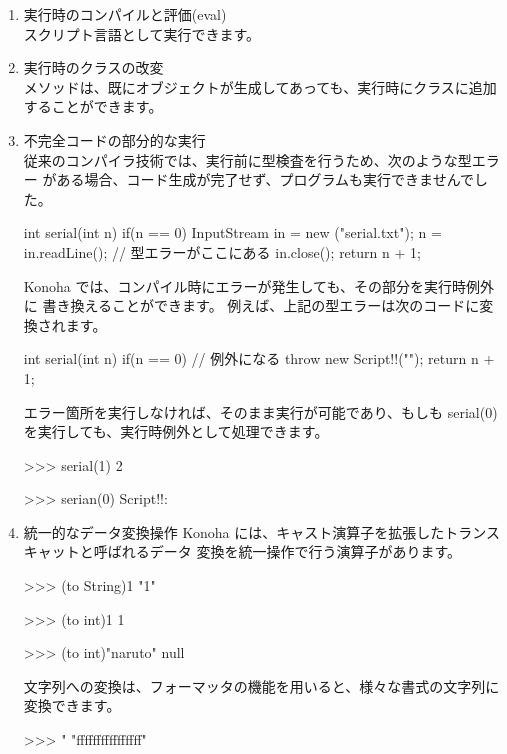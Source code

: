 \documentclass[mingoth,a4paper]{jsarticle}
\begin{document}
\begin{enumerate}
\item 実行時のコンパイルと評価(eval)\\
スクリプト言語として実行できます。

\item 実行時のクラスの改変\\
メソッドは、既にオブジェクトが生成してあっても、実行時にクラスに追加
することができます。

\item 不完全コードの部分的な実行\\
従来のコンパイラ技術では、実行前に型検査を行うため、次のような型エラー
がある場合、コード生成が完了せず、プログラムも実行できませんでした。

\begin{commandline}
int serial(int n) {
  if(n == 0) {
    InputStream in = new ("serial.txt");
    n = in.readLine(); // 型エラーがここにある
    in.close();
  }
  return n + 1;
}
\end{commandline}

Konoha では、コンパイル時にエラーが発生しても、その部分を実行時例外に
書き換えることができます。
例えば、上記の型エラーは次のコードに変換されます。

\begin{commandline}
int serial(int n) {
  if(n == 0) { // 例外になる
    throw new Script!!("");
  }
  return n + 1;
}
\end{commandline}

エラー箇所を実行しなければ、そのまま実行が可能であり、もしも
serial(0) を実行しても、実行時例外として処理できます。

\begin{commandline}
>>> serial(1)
2

>>> serian(0)
Script!!:
\end{commandline}

\item 統一的なデータ変換操作
Konoha には、キャスト演算子を拡張したトランスキャットと呼ばれるデータ
変換を統一操作で行う演算子があります。

\begin{commandline}
>>> (to String)1
"1"

>>> (to int)1
1

>>> (to int)"naruto"
null
\end{commandline}

文字列への変換は、フォーマッタの機能を用いると、様々な書式の文字列に
変換できます。

\begin{commandline}
>>> "%
"ffffffffffffffff"


\end{commandline}
\end{enumerate}
\end{document}
